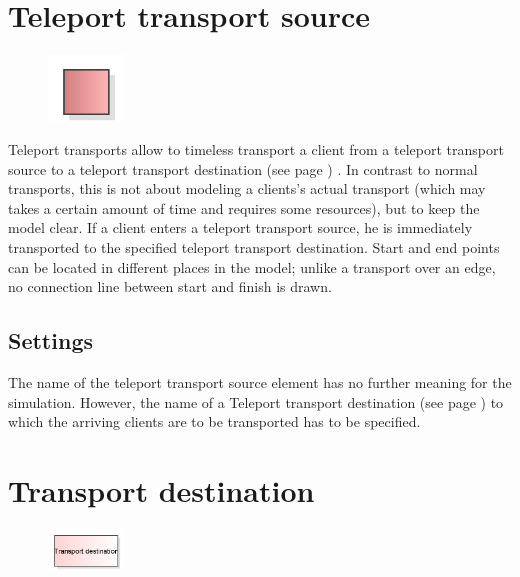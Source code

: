\section{Teleport transport source}
\label{ref:ModelElementTeleportSource}

\begin{figure}
\vspace{-22pt}
\includegraphics[width=2cm]{imageModelElementTeleportSource.png}
\vspace{-22pt}
\end{figure}

Teleport transports allow to timeless transport a client from a teleport transport source
to a teleport transport destination (see page \pageref{ref:ModelElementTeleportDestination}) .
In contrast to normal transports, this is not about modeling a clients's actual transport
(which may takes a certain amount of time and requires some resources), but to keep the model clear.
If a client enters a teleport transport source, he is immediately transported to the specified
teleport transport destination. Start and end points can be located in different places in the model;
unlike a transport over an edge, no connection line between start and finish is drawn.

\subsection*{Settings}

The name of the teleport transport source element has no further meaning for the simulation.
However, the name of a Teleport transport destination (see page \pageref{ref:ModelElementTeleportDestination}) 
to which the arriving clients are to be transported has to be specified.


\section{Transport destination}
\label{ref:ModelElementTransportDestination}

\begin{figure}
\vspace{-22pt}
\includegraphics[width=2cm]{imageModelElementTransportDestination.png}
\vspace{-22pt}
\end{figure}

